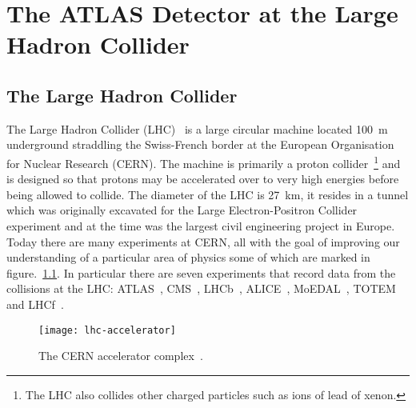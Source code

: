  \chapter{The ATLAS Detector at the Large Hadron Collider}%
\label{sec:detector}



\section{The Large Hadron Collider}%
\label{sec:lhc}%
The Large Hadron Collider (LHC)~\cite{LHC-dr} is a large circular machine
located 100~m underground straddling the Swiss-French border at the European
Organisation for Nuclear Research (CERN). The machine is primarily a proton
collider~\footnote{The LHC also collides other charged particles such as ions of
  lead of xenon.} and is designed so that protons may be accelerated
over to very high energies before being allowed to collide. The diameter of the
LHC is 27~km, it resides in a tunnel which was originally excavated for the
Large Electron-Positron Collider~\cite{LEP} experiment and at the time was the
largest civil engineering project in Europe. Today there are many experiments at
CERN, all with the goal of improving our understanding of a particular area of
physics some of which are marked in figure.~\ref{fig:lhc-acc}. In particular
there are seven experiments that record data from the collisions at the LHC:
ATLAS~\cite{ATLAS-loi}, CMS~\cite{CMS-loi}, LHCb~\cite{lhcb-loi},
ALICE~\cite{ALICE-loi}, MoEDAL~\cite{MoEDAL-loi}, TOTEM~\cite{TOTEM-loi} and
LHCf~\cite{lhcf-loi}.
\begin{figure}[h]
  \centering
  \texttt{[image: lhc-accelerator]}
  \caption[The CERN accelerator complex]{The CERN accelerator
    complex~\cite{LHC-acc-fig}.}%
  \label{fig:lhc-acc}
\end{figure}

